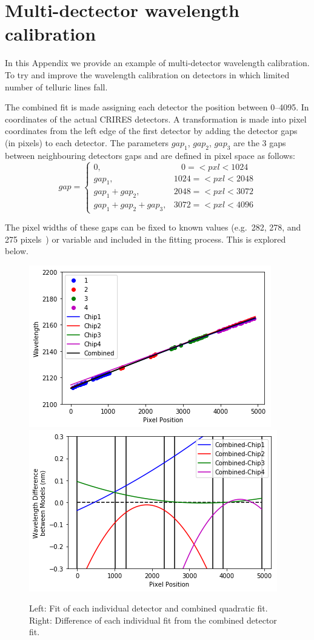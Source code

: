 
\chapter{Multi-dectector wavelength calibration} %
\label{appendix:wavelength_fitting}

In this Appendix we provide an example of multi-detector wavelength calibration.
To try and improve the wavelength calibration on detectors in which limited number of telluric lines fall.


The combined fit is made assigning each detector the position between 0--4095.
In coordinates of the actual CRIRES detectors.
A transformation is made into pixel coordinates from the left edge of the first detector by adding the detector gaps (in pixels) to each detector.
The parameters \(gap_{1}\), \(gap_{2}\), \(gap_{3}\) are the 3 gaps between neighbouring detectors gaps and are defined in pixel space as follows:
\[
gap =\begin{cases}
0,                      &~~~~0=<pxl<1024\\
gap_1,                   &1024=<pxl<2048\\
gap_1 + gap_2,            &2048=<pxl<3072\\
gap_1 + gap_2 + gap_3,     &3072=<pxl<4096
\end{cases}
\]

The pixel widths of these gaps can be fixed to known values (e.g.\ 282, 278, and 275 pixels~\citep{brogi_rotation_2016}) or variable and included in the fitting process.
This is explored below.




\begin{figure}
    \centering
    \includegraphics[width=0.45\linewidth]{./figures/appendix/multi_detector_fit}
    \includegraphics[width=0.45\linewidth]{./figures/appendix/multidector_fit_diff}
    \caption{Left: Fit of each individual detector and combined quadratic fit.
Right: Difference of each individual fit from the combined detector fit.}
    \label{fig:multidectorfitdiff}
\end{figure}


